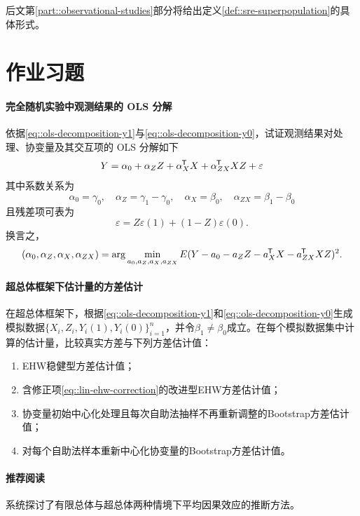 后文第\ref{part::observational-studies}部分将给出定义\ref{def::sre-superpopulation}的具体形式。 
  

 \section{作业习题}
 
\paragraph{完全随机实验中观测结果的 OLS 分解}\label{hw::ols-decompose-cre}

依据\eqref{eq::ols-decomposition-y1}与\eqref{eq::ols-decomposition-y0}，试证观测结果对处理、协变量及其交互项的 OLS 分解如下
$$
Y= \alpha_0 + \alpha_Z  Z +
\alpha_X ^{\mkern-1.5mu\mathsf{T}} X + \alpha_{ZX} ^{\mkern-1.5mu\mathsf{T}} X Z + \varepsilon 
$$
其中系数关系为
$$
\alpha_0 = \gamma_0 ,\quad
\alpha_Z = \gamma_1 - \gamma_0,\quad
\alpha_X  =  \beta_0, \quad
\alpha_{ZX} = \beta_1 - \beta_0
$$
且残差项可表为
$$
\varepsilon  = Z \varepsilon (1) + (1-Z) \varepsilon (0). 
$$
换言之，
$$
(\alpha_0, \alpha_Z, \alpha_X , \alpha_{ZX} )
=\arg\min_{a_0, a_Z, a_X, a_{ZX}   }  E  (  Y - a_0 - a_Z Z - a_X^{\mkern-1.5mu\mathsf{T}} X -a_{ZX} ^{\mkern-1.5mu\mathsf{T}} X Z)^2.
$$ 
 
 
\paragraph{超总体框架下\citet{lin2013}估计量的方差估计}\label{hw::variance-bootstrap-superpopulation}
 
在超总体框架下，根据\eqref{eq::ols-decomposition-y1}和\eqref{eq::ols-decomposition-y0}生成模拟数据$\{  X_i, Z_i, Y_i(1), Y_i(0) \}_{i=1}^n$，并令$\beta_1 \neq \beta_0$成立。在每个模拟数据集中计算\citet{lin2013}的估计量，比较真实方差与下列方差估计值：
\begin{enumerate}
\item
EHW稳健型方差估计值；
\item
含修正项\eqref{eq::lin-ehw-correction}的改进型EHW方差估计值；
\item
协变量初始中心化处理且每次自助法抽样不再重新调整的Bootstrap方差估计值；
\item
对每个自助法样本重新中心化协变量的Bootstrap方差估计值。
\end{enumerate}

  
 


\paragraph{推荐阅读}


\citet{ding2017bridging}系统探讨了有限总体与超总体两种情境下平均因果效应的推断方法。 

